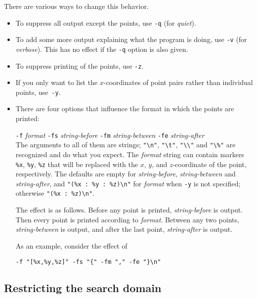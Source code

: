 \documentclass[12pt,a4paper,oneside]{amsart}
\begin{document}
There are various ways to change this behavior.
\begin{itemize}\setlength{\parindent}{0mm}\setlength{\parskip}{1ex}
  \item To suppress all output except the points, use \verb+-q+ (for
        {\em quiet}).
  \item To add some more output explaining what the program is doing,
        use \verb+-v+ (for {\em verbose}). This has no effect if
        the \verb+-q+ option is also given.
  \item To suppress printing of the points, use \verb+-z+.
  \item If you only want to list the $x$-coordinates of point pairs rather
        than individual points, use~\verb+-y+.
  \item There are four options that influence the format in which the
        points are printed: \\
        \strut\quad \verb+-f+ {\em format} \verb+-fs+ {\em string-before}
        \verb+-fm+ {\em string-between} \verb+-fe+ {\em string-after} \\
        The arguments to all of them are strings; \verb+"\n"+, \verb+"\t"+,
        \verb+"\\"+ and \verb+"\%"+ are recognized and do what you expect.
        The {\em format} string can contain markers \verb+%x+, \verb+%y+,
        \verb+%z+ that will be replaced with the $x$, $y$, and $z$-coordinate
        of the point, respectively. The defaults are empty for
        {\em string-before}, {\em string-between} and {\em string-after},
        and \verb+"(%x : %y : %z)\n"+ for {\em format} when \verb+-y+
        is not specified; otherwise \verb+"(%x : %z)\n"+.

        The effect is as follows. Before any point is printed,
        {\em string-before} is output. Then every point is printed
        according to {\em format}. Between any two points, {\em string-between}
        is output, and after the last point, {\em string-after} is output.

        As an example, consider the effect of \\
        \strut\quad\verb+-f "[%x,%y,%z]" -fs "{" -fm "," -fe "}\n"+
\end{itemize}

\subsection{Restricting the search domain}
\end{document}
